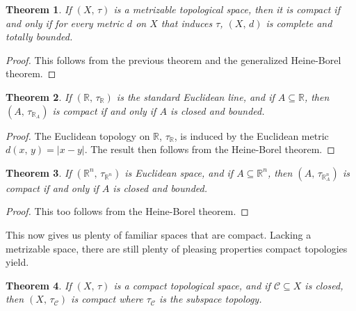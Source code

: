 \documentclass{article}
\theoremstyle{plain}
\newtheorem{theorem}{Theorem}[section]
\theoremstyle{normal}
\begin{document}
        \begin{theorem}
            If $(X,\,\tau)$ is a metrizable topological space, then it is
            compact if and only if for every metric $d$ on $X$ that induces
            $\tau$, $(X,\,d)$ is complete and totally bounded.
        \end{theorem}
        \begin{proof}
            This follows from the previous theorem and the generalized
            Heine-Borel theorem.
        \end{proof}
        \begin{theorem}
            If $(\mathbb{R},\,\tau_{\mathbb{R}})$ is the standard Euclidean
            line, and if $A\subseteq\mathbb{R}$, then
            $(A,\,\tau_{\mathbb{R}_{A}})$ is compact if and only if $A$ is
            closed and bounded.
        \end{theorem}
        \begin{proof}
            The Euclidean topology on $\mathbb{R}$,
            $\tau_{\mathbb{R}}$, is induced by the Euclidean metric
            $d(x,\,y)=|x-y|$. The result then follows from the Heine-Borel
            theorem.
        \end{proof}
        \begin{theorem}
            If $(\mathbb{R}^{n},\,\tau_{\mathbb{R}^{n}})$ is Euclidean space,
            and if $A\subseteq\mathbb{R}^{n}$, then
            $(A,\,\tau_{\mathbb{R}^{n}_{A}})$ is compact if and only if $A$ is
            closed and bounded.
        \end{theorem}
        \begin{proof}
            This too follows from the Heine-Borel theorem.
        \end{proof}
        This now gives us plenty of familiar spaces that are compact.
        Lacking a metrizable space, there are still plenty of pleasing
        properties compact topologies yield.
        \begin{theorem}
            If $(X,\,\tau)$ is a compact topological space, and if
            $\mathcal{C}\subseteq{X}$ is closed, then
            $(X,\,\tau_{\mathcal{C}})$ is compact where $\tau_{\mathcal{C}}$ is
            the subspace topology.
        \end{theorem}
\end{document}
